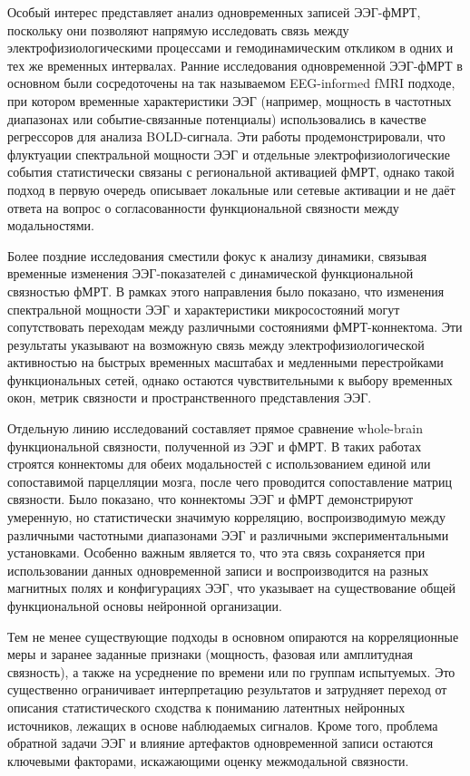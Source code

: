\documentclass[12pt]{article}
\begin{document}
Особый интерес представляет анализ одновременных записей ЭЭГ-фМРТ, поскольку они позволяют напрямую исследовать связь между электрофизиологическими процессами и гемодинамическим откликом в одних и тех же временных интервалах.
Ранние исследования одновременной ЭЭГ-фМРТ в основном были сосредоточены на так называемом EEG-informed fMRI подходе, при котором временные характеристики ЭЭГ (например, мощность в частотных диапазонах или событие-связанные потенциалы) использовались в качестве регрессоров для анализа BOLD-сигнала. Эти работы продемонстрировали, что флуктуации спектральной мощности ЭЭГ и отдельные электрофизиологические события статистически связаны с региональной активацией фМРТ, однако такой подход в первую очередь описывает локальные или сетевые активации и не даёт ответа на вопрос о согласованности функциональной связности между модальностями.

Более поздние исследования сместили фокус к анализу динамики, связывая временные изменения ЭЭГ-показателей с динамической функциональной связностью фМРТ. В рамках этого направления было показано, что изменения спектральной мощности ЭЭГ и характеристики микросостояний могут сопутствовать переходам между различными состояниями фМРТ-коннектома. Эти результаты указывают на возможную связь между электрофизиологической активностью на быстрых временных масштабах и медленными перестройками функциональных сетей, однако остаются чувствительными к выбору временных окон, метрик связности и пространственного представления ЭЭГ.

Отдельную линию исследований составляет прямое сравнение whole-brain функциональной связности, полученной из ЭЭГ и фМРТ. В таких работах строятся коннектомы для обеих модальностей с использованием единой или сопоставимой парцелляции мозга, после чего проводится сопоставление матриц связности. Было показано, что коннектомы ЭЭГ и фМРТ демонстрируют умеренную, но статистически значимую корреляцию, воспроизводимую между различными частотными диапазонами ЭЭГ и различными экспериментальными установками. Особенно важным является то, что эта связь сохраняется при использовании данных одновременной записи и воспроизводится на разных магнитных полях и конфигурациях ЭЭГ, что указывает на существование общей функциональной основы нейронной организации.

Тем не менее существующие подходы в основном опираются на корреляционные меры и заранее заданные признаки (мощность, фазовая или амплитудная связность), а также на усреднение по времени или по группам испытуемых. Это существенно ограничивает интерпретацию результатов и затрудняет переход от описания статистического сходства к пониманию латентных нейронных источников, лежащих в основе наблюдаемых сигналов. Кроме того, проблема обратной задачи ЭЭГ и влияние артефактов одновременной записи остаются ключевыми факторами, искажающими оценку межмодальной связности.
\end{document}
